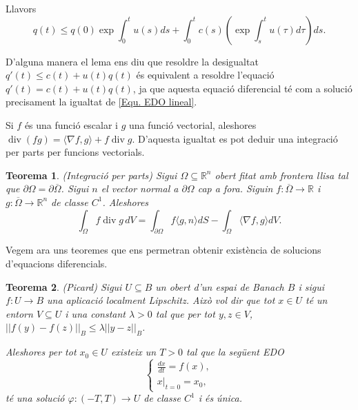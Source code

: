 \documentclass{article}
\numberwithin{equation}{section}
\DeclareMathOperator{\diver}{div}
\newtheorem{teorema}{Teorema}[section]
\begin{document}
Llavors
\begin{equation}\label{Equ. EDO lineal}
q(t)\leq q(0)\exp\int_0^tu(s)ds+\int_0^tc(s)\left(\exp\int_s^tu(\tau)d\tau\right)ds.
\end{equation}

D'alguna manera el lema ens diu que resoldre la desigualtat $q'(t)\leq c(t)+u(t)q(t)$ \'{e}s equivalent a resoldre l'equaci\'{o} $ q'(t)=c(t)+u(t)q(t)$, ja que aquesta equaci\'{o} diferencial t\'{e} com a soluci\'{o} precisament la igualtat de \eqref{Equ. EDO lineal}.
\vspace{3mm}

Si $f$ \'{e}s una funci\'{o} escalar i $g$ una funci\'{o} vectorial, aleshores $\diver(fg)=\langle\nabla f,g\rangle+f\diver g$. D'aquesta igualtat es pot deduir una integraci\'{o} per parts per funcions vectorials.

\begin{teorema}\label{Teo: integracio parts}
(Integraci\'{o} per parts) Sigui $\Omega\subseteq\mathbb{R}^n$ obert fitat amb frontera llisa tal que $\partial\Omega=\partial\overline\Omega$. Sigui $n$ el vector normal a $\partial\Omega$ cap a fora. Siguin $f:\overline{\Omega}\rightarrow\mathbb{R}$ i $g:\overline{\Omega}\rightarrow\mathbb{R}^n$ de classe $C^1$. Aleshores
\begin{equation}
\int_{\Omega}f\diver g\,dV=\int_{\partial\Omega}f\langle g,n\rangle dS-\int_{\Omega}\langle\nabla f,g\rangle dV.
\end{equation}
\end{teorema}
\vspace{3mm}

Vegem ara uns teoremes que ens permetran obtenir exist\`{e}ncia de solucions d'equacions diferencials.

\begin{teorema}\label{Teo: Picard}
(Picard) Sigui $U\subseteq B$ un obert d'un espai de Banach $B$ i sigui $f:U\rightarrow B$ una aplicaci\'{o} localment Lipschitz. Aix\`{o} vol dir que tot $x\in U$ t\'{e} un entorn $V\subseteq U$ i una constant $\lambda>0$ tal que per tot $y,z\in V$, $||f(y)-f(z)||_B\leq\lambda||y-z||_B$.

Aleshores per tot $x_0\in U$ existeix un $T>0$ tal que la seg\"{u}ent EDO
\[\left\{\begin{array}{l}\displaystyle{\frac{dx}{dt}=f(x),}\\x|_{t=0}=x_0,\end{array}\right.\]
t\'{e} una soluci\'{o} $\varphi:(-T,T)\rightarrow U$ de classe $C^1$ i \'{e}s \'{u}nica.
\end{teorema}
\end{document}

